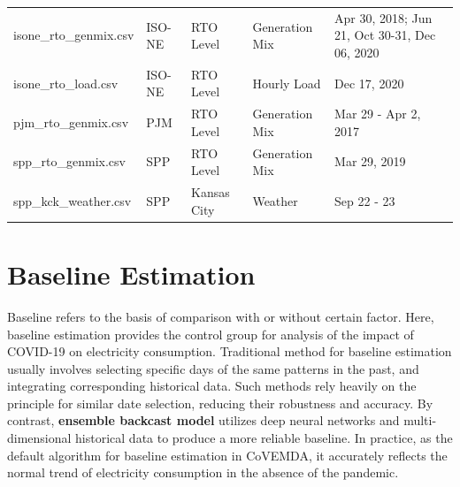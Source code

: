 \documentclass[10pt]{article}
\newcommand{\covemda}{CoVEMDA}
\numberwithin{equation}{section}
\numberwithin{table}{section}
\numberwithin{figure}{section}
\begin{document}
\begin{table}[htbp]
\begin{tabular}{llllp{}}
	isone\_rto\_genmix.csv                    & ISO-NE                              & RTO Level                         & Generation Mix                        & Apr 30, 2018; Jun 21, Oct 30-31, Dec 06, 2020                                                                                \\
	isone\_rto\_load.csv                      & ISO-NE                              & RTO Level                         & Hourly Load                           & Dec 17, 2020                                                                                                                 \\
	pjm\_rto\_genmix.csv                      & PJM                                 & RTO Level                         & Generation Mix                        & Mar 29 - Apr 2, 2017                                                                                                         \\
	spp\_rto\_genmix.csv                      & SPP                                 & RTO Level                         & Generation Mix                        & Mar 29, 2019                                                                                                                 \\
	spp\_kck\_weather.csv                     & SPP                                 & Kansas City                       & Weather                               & Sep 22 - 23                \\                                                                                                 
	\bottomrule
	\end{tabular}
	\end{table}










\newpage
\section{Baseline Estimation} \label{sec:baseline}

Baseline refers to the basis of comparison with or without certain factor. Here, baseline estimation provides the control group for analysis of the impact of COVID-19 on electricity consumption. Traditional method for baseline estimation usually involves selecting specific days of the same patterns in the past, and integrating corresponding historical data. Such methods rely heavily on the principle for similar date selection, reducing their robustness and accuracy. By contrast, \textbf{ensemble backcast model} utilizes deep neural networks and multi-dimensional historical data to produce a more reliable baseline. In practice, as the default algorithm for baseline estimation in \covemda{}, it accurately reflects the normal trend of electricity consumption in the absence of the pandemic.
\end{document}
